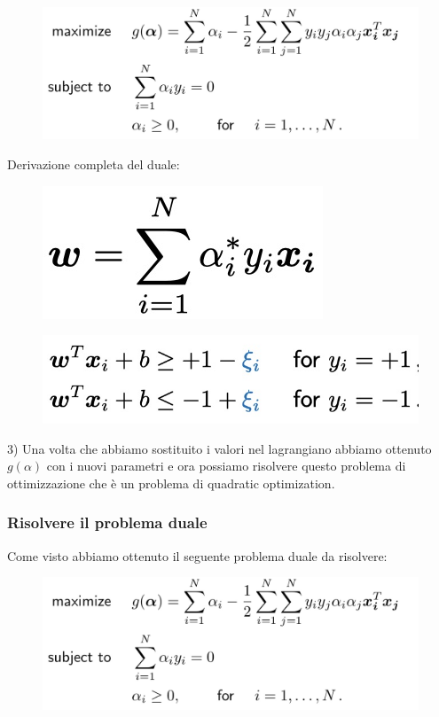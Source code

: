 \documentclass[14pt]{extreport}
\begin{document}
\begin{figure}[H]
\centering
\includegraphics[width=0.7\linewidth]{318.jpeg}
\end{figure}

Derivazione completa del duale:

\begin{figure}[H]
\centering
\includegraphics[width=\linewidth]{319.jpeg}
\end{figure}
\begin{figure}[H]
\centering
\includegraphics[width=\linewidth]{320.jpeg}
\end{figure}

3) Una volta che abbiamo sostituito i valori nel lagrangiano abbiamo ottenuto $g(\alpha)$ con i nuovi parametri e ora possiamo risolvere questo
problema di ottimizzazione che è un problema di quadratic optimization.

\subsubsection{Risolvere il problema duale}

Come visto abbiamo ottenuto il seguente problema duale da risolvere:
\begin{figure}[H]
\centering
\includegraphics[width=0.7\linewidth]{318.jpeg}
\end{figure}
\end{document}

